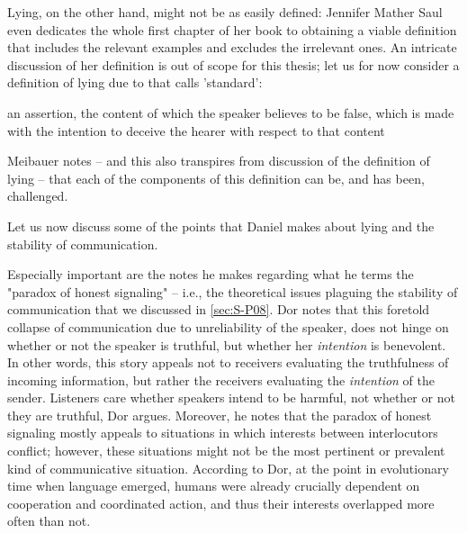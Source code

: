 Lying, on the other hand, might not be as easily defined: Jennifer Mather Saul even dedicates the whole first chapter of her \citeyear{Saul12} book to obtaining a viable definition that includes the relevant examples and excludes the irrelevant ones. An intricate discussion of her definition is out of scope for this thesis; let us for now consider a definition of lying due to \citet{Williams02} that \citet{Meibauer18} calls 'standard':
\begin{quoting}
    an assertion, the content of which the speaker believes to be false, which is made with the intention to deceive the hearer with respect to that content
    \hfill \citep[p.~96]{Williams02}
\end{quoting}
Meibauer notes -- and this also transpires from  discussion of the definition of lying -- that each of the components of this definition can be, and has been, challenged.

Let us now discuss some of the points that Daniel \citet{Dor17} makes about lying and the stability of communication.

Especially important are the notes he makes regarding what he terms the "paradox of honest signaling" \citep[p.~46]{Dor17} -- i.e., the theoretical issues plaguing the stability of communication that we discussed in \cref{sec:S-P08}. 
Dor notes that this foretold collapse of communication due to unreliability of the speaker, does not hinge on whether or not the speaker is truthful, but whether her \emph{intention} is benevolent.
In other words, this story appeals not to receivers evaluating the truthfulness of incoming information, but rather the receivers evaluating the \emph{intention} of the sender. Listeners care whether speakers intend to be harmful, not whether or not they are truthful, Dor argues.
Moreover, he notes that the paradox of honest signaling mostly appeals to situations in which interests between interlocutors conflict; however, these situations might not be the most pertinent or prevalent kind of communicative situation.
According to Dor, at the point in evolutionary time when language emerged, humans were already crucially dependent on cooperation and coordinated action, and thus their interests overlapped more often than not.

